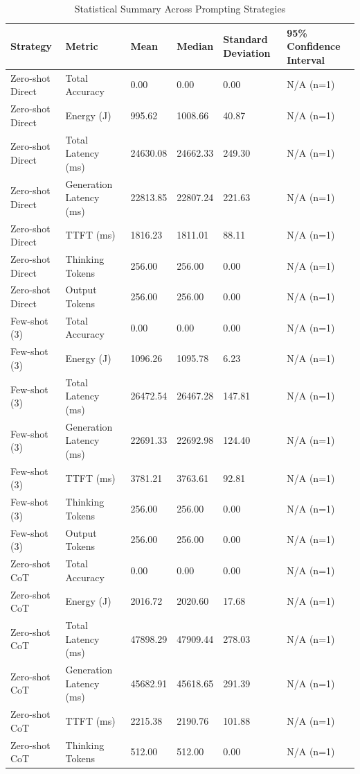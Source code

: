 \begin{table}
\caption{Statistical Summary Across Prompting Strategies}
\label{tab:statistical_summary}
\begin{tabular}{llllll}
\toprule
Strategy & Metric & Mean & Median & Standard Deviation & 95\% Confidence Interval \\
\midrule
Zero-shot Direct & Total Accuracy & 0.00 & 0.00 & 0.00 & N/A (n=1) \\
Zero-shot Direct & Energy (J) & 995.62 & 1008.66 & 40.87 & N/A (n=1) \\
Zero-shot Direct & Total Latency (ms) & 24630.08 & 24662.33 & 249.30 & N/A (n=1) \\
Zero-shot Direct & Generation Latency (ms) & 22813.85 & 22807.24 & 221.63 & N/A (n=1) \\
Zero-shot Direct & TTFT (ms) & 1816.23 & 1811.01 & 88.11 & N/A (n=1) \\
Zero-shot Direct & Thinking Tokens & 256.00 & 256.00 & 0.00 & N/A (n=1) \\
Zero-shot Direct & Output Tokens & 256.00 & 256.00 & 0.00 & N/A (n=1) \\
Few-shot (3) & Total Accuracy & 0.00 & 0.00 & 0.00 & N/A (n=1) \\
Few-shot (3) & Energy (J) & 1096.26 & 1095.78 & 6.23 & N/A (n=1) \\
Few-shot (3) & Total Latency (ms) & 26472.54 & 26467.28 & 147.81 & N/A (n=1) \\
Few-shot (3) & Generation Latency (ms) & 22691.33 & 22692.98 & 124.40 & N/A (n=1) \\
Few-shot (3) & TTFT (ms) & 3781.21 & 3763.61 & 92.81 & N/A (n=1) \\
Few-shot (3) & Thinking Tokens & 256.00 & 256.00 & 0.00 & N/A (n=1) \\
Few-shot (3) & Output Tokens & 256.00 & 256.00 & 0.00 & N/A (n=1) \\
Zero-shot CoT & Total Accuracy & 0.00 & 0.00 & 0.00 & N/A (n=1) \\
Zero-shot CoT & Energy (J) & 2016.72 & 2020.60 & 17.68 & N/A (n=1) \\
Zero-shot CoT & Total Latency (ms) & 47898.29 & 47909.44 & 278.03 & N/A (n=1) \\
Zero-shot CoT & Generation Latency (ms) & 45682.91 & 45618.65 & 291.39 & N/A (n=1) \\
Zero-shot CoT & TTFT (ms) & 2215.38 & 2190.76 & 101.88 & N/A (n=1) \\
Zero-shot CoT & Thinking Tokens & 512.00 & 512.00 & 0.00 & N/A (n=1) \\

\end{tabular}
\end{table}
